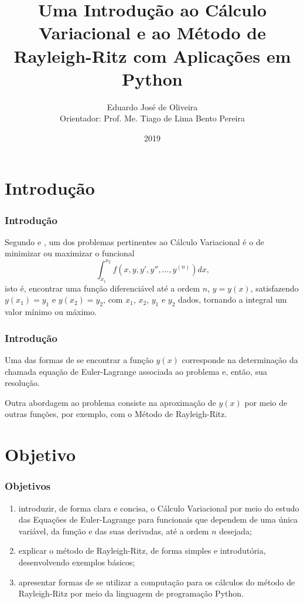 \documentclass{beamer}
\title[Cálculo Variacional e o Método de Rayleigh-Ritz]{Uma Introdução ao Cálculo Variacional e ao Método de Rayleigh-Ritz com Aplicações em Python}
\author[Eduardo José de Oliveira]{
	Eduardo José de Oliveira\\
	Orientador: Prof. Me. Tiago de Lima Bento Pereira
}
\institute[Universidade Estadual de Goiás]{
	UNIVERSIDADE ESTADUAL DE GOIÁS\\
  	Câmpus Anápolis de Ciências Exatas e Tecnológicas Henrique Santillo \\
  	Matemática
}
\date[2019]{2019}
\begin{document}
	\begin{frame}[plain]
	  \titlepage
	\end{frame}

	\section{Introdução}
	\begin{frame}
		\frametitle{Introdução}
		
		\justify
		Segundo  e , um dos problemas pertinentes ao Cálculo Variacional é o de minimizar ou maximizar o funcional
		$$
			\int_{x_1}^{x_2} f(x, y, y', y'', \dots, y^{(n)})dx\text{,}
		$$
		isto é, encontrar uma função diferenciável até a ordem $n$, $y=y(x)$, satisfazendo $y(x_1)=y_1$ e $y(x_2)=y_2$, com $x_1$, $x_2$, $y_1$ e $y_2$ dados, tornando a integral um valor mínimo ou máximo.
	\end{frame}
	
	\begin{frame}
		\frametitle{Introdução}
		\justify

		Uma das formas de se encontrar a função $y(x)$ corresponde na determinação da chamada equação de Euler-Lagrange associada ao problema e, então, sua resolução.
		\vspace{10pt}
		\pause
		
		Outra abordagem ao problema consiste na aproximação de $y(x)$ por meio de outras funções, por exemplo, com o Método de Rayleigh-Ritz.
	\end{frame}
	
	\section{Objetivo}
	\begin{frame}
		\frametitle{Objetivos}
	
		\begin{enumerate}
			\justifying
			\item introduzir, de forma clara e concisa, o Cálculo Variacional por meio do estudo das Equações de Euler-Lagrange para funcionais que dependem de uma única variável, da função e das suas derivadas, até a ordem $n$ desejada;
			
			\item explicar o método de Rayleigh-Ritz, de forma simples e introdutória, desenvolvendo exemplos básicos;
			
			\item apresentar formas de se utilizar a computação para os cálculos do método de Rayleigh-Ritz por meio da linguagem de programação Python.
		\end{enumerate}
	\end{frame}
\end{document}
